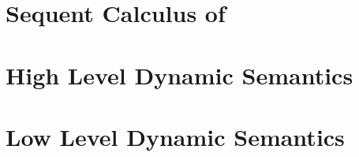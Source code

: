 \chapter{Sequent Calculus of \fragment}\label{sec:fragment}


\chapter{High Level Dynamic Semantics}\label{sec:hld}


\chapter{Low Level Dynamic Semantics}\label{sec:lld}


